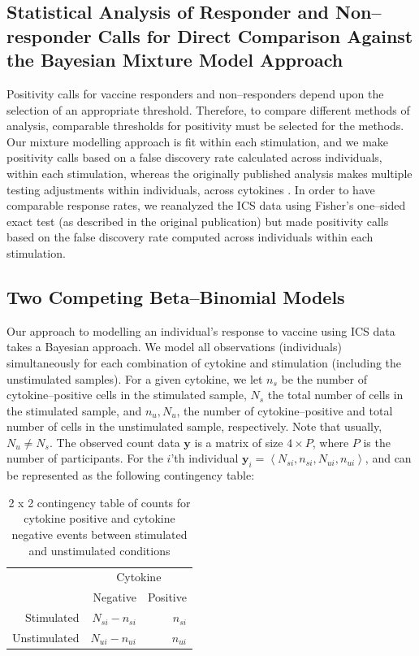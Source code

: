 \documentclass[11pt]{article}
\begin{document}
\subsection{Statistical Analysis of Responder and Non--responder Calls for Direct Comparison Against the Bayesian Mixture Model Approach}
Positivity calls for vaccine responders and non--responders depend upon the selection of an appropriate threshold. Therefore, to compare different methods of analysis, comparable thresholds for positivity must be selected for the methods. Our mixture modelling approach is fit within each stimulation, and we make positivity calls based on a false discovery rate calculated across individuals, within each stimulation, whereas the originally published analysis makes multiple testing adjustments within individuals, across cytokines . In order to have comparable response rates, we reanalyzed the ICS data using Fisher's one--sided exact test (as described in the original publication) but made positivity calls based on the false discovery rate computed across individuals within each stimulation.

\subsection{Two Competing Beta--Binomial Models}
Our approach to modelling an individual's response to vaccine using ICS data takes a Bayesian approach. We model all observations (individuals) simultaneously for each combination of cytokine and stimulation (including the unstimulated samples). For a given cytokine, we let $n_s$ be the number of cytokine--positive cells in the stimulated sample, $N_s$ the total number of cells in the stimulated sample, and $n_u, N_u$, the number of cytokine--positive and total number of cells in the unstimulated sample, respectively. Note that usually, $N_u \ne N_s$. The observed count data $\mathbf{y}$ is a matrix of size $4 \times P$, where $P$ is the number of participants. For the $i$'th individual $\mathbf{y}_i = \left<N_{si},n_{si},N_{ui},n_{ui}\right>$, and can be represented as the following contingency table: 
\begin{table}[ht]
\centering
\parbox{0.8\linewidth}{
\caption{2 x 2 contingency table of counts for cytokine positive and cytokine negative events between stimulated and unstimulated conditions}\label{tab:twobytwo}
\centering
\begin{tabular}{rrr}

  \hline
\multicolumn{1}{l}{}&
\multicolumn{2}{c}{Cytokine}\\
 & Negative & Positive \\ 
  \hline
Stimulated &   $N_{si} - n_{si}$ &   $n_{si}$ \\ 
Unstimulated &   $N_{ui}-n_{ui}$ &   $n_{ui}$ \\ 
   \hline
\end{tabular}
}
\end{table}
\end{document}
